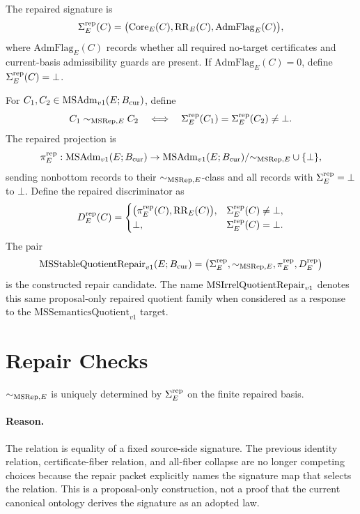 \begin{definition}
The repaired signature is
\[
  \Sigma^{\mathrm{rep}}_E(C)=
  \bigl(\mathrm{Core}_E(C),\mathrm{RR}_E(C),
  \mathrm{AdmFlag}_E(C)\bigr),
\]
where \(\mathrm{AdmFlag}_E(C)\) records whether all required no-target
certificates and current-basis admissibility guards are present. If
\(\mathrm{AdmFlag}_E(C)=0\), define \(\Sigma^{\mathrm{rep}}_E(C)=\bot\).
\end{definition}

\begin{definition}
For \(C_1,C_2\in\mathrm{MSAdm}_{v1}(E;B_{\mathrm{cur}})\), define
\[
  C_1\mathrel{\sim_{\mathrm{MSRep},E}} C_2
  \quad\Longleftrightarrow\quad
  \Sigma^{\mathrm{rep}}_E(C_1)=\Sigma^{\mathrm{rep}}_E(C_2)\neq\bot.
\]
The repaired projection is
\[
  \pi^{\mathrm{rep}}_E:\mathrm{MSAdm}_{v1}(E;B_{\mathrm{cur}})\to
  \mathrm{MSAdm}_{v1}(E;B_{\mathrm{cur}})/{\sim_{\mathrm{MSRep},E}}\cup\{\bot\},
\]
sending nonbottom records to their \(\sim_{\mathrm{MSRep},E}\)-class and all records with
\(\Sigma^{\mathrm{rep}}_E=\bot\) to \(\bot\). Define the repaired discriminator as
\[
  D^{\mathrm{rep}}_E(C)=
  \begin{cases}
    \bigl(\pi^{\mathrm{rep}}_E(C),\mathrm{RR}_E(C)\bigr), & \Sigma^{\mathrm{rep}}_E(C)\neq\bot,\\
    \bot, & \Sigma^{\mathrm{rep}}_E(C)=\bot.
  \end{cases}
\]
The pair
\[
  \mathrm{MSStableQuotientRepair}_{v1}(E;B_{\mathrm{cur}})=
  \bigl(\Sigma^{\mathrm{rep}}_E,\sim_{\mathrm{MSRep},E},\pi^{\mathrm{rep}}_E,D^{\mathrm{rep}}_E\bigr)
\]
is the constructed repair candidate. The name
\(\mathrm{MSIrrelQuotientRepair}_{v1}\) denotes this same proposal-only repaired quotient family
when considered as a response to the \(\mathrm{MSSemanticsQuotient}_{v1}\)
target.
\end{definition}

\section{Repair Checks}

\begin{proposition}
\(\sim_{\mathrm{MSRep},E}\) is uniquely determined by \(\Sigma^{\mathrm{rep}}_E\) on the finite repaired
basis.
\end{proposition}

\paragraph{Reason.}
The relation is equality of a fixed source-side signature. The previous
identity relation, certificate-fiber relation, and all-fiber collapse are no
longer competing choices because the repair packet explicitly names the
signature map that selects the relation. This is a proposal-only construction,
not a proof that the current canonical ontology derives the signature as an
adopted law.


